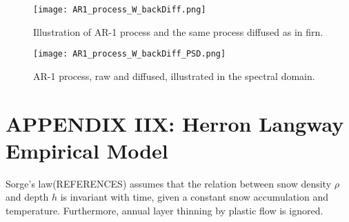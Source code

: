 \documentclass[../../CompleteThesis2/Complete_2ndDraft.tex]{subfiles}
\begin{document}
	\begin{figure}[h]
		\centering
		\texttt{[image: AR1\_process\_W\_backDiff.png]}
		\caption[AR-1 process with diffusion.]{\small Illustration of AR-1 process and the same process diffused as in firn.}
		\label{fig:AR1_process_W_backDiff}
	\end{figure}
	
	\begin{figure}[h]
		\centering
		\texttt{[image: AR1\_process\_W\_backDiff\_PSD.png]}
		\caption[AR-1 process in the spectral domain, raw and diffused.]{\small AR-1 process, raw and diffused, illustrated in the spectral domain.}
		\label{fig:AR1_process_W_backDiff_PSD}
	\end{figure}




	\newpage
	\section[Appendix IIX: HL Empirical Model]{APPENDIX IIX: Herron Langway Empirical Model}
	\label{AppIIX:HLmodel}
	
	
	Sorge's law(REFERENCES) assumes that the relation between snow density $\rho$ and depth $h$ is invariant with time, given a constant snow accumulation and temperature. Furthermore, annual layer thinning by plastic flow is ignored.
	
\end{document}
